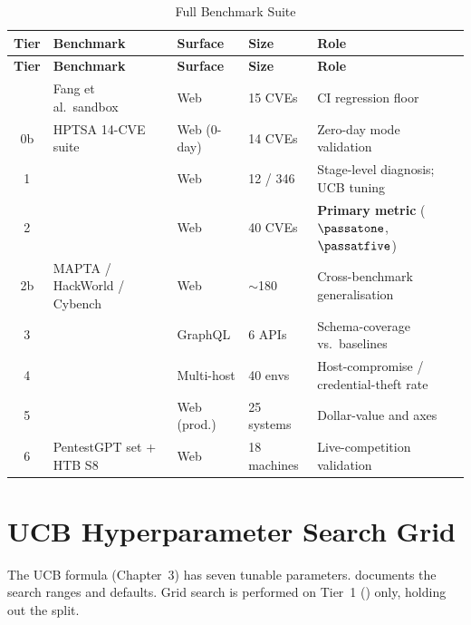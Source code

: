 \begin{longtable}{clp{3.5cm}lp{4cm}}
  \caption{Full \redgrid{} Benchmark Suite}\label{tab:benchmark-suite} \\
  \hline
  \textbf{Tier} & \textbf{Benchmark} & \textbf{Surface} & \textbf{Size} & \textbf{Role} \\
  \hline
  \endfirsthead
  \hline
  \textbf{Tier} & \textbf{Benchmark} & \textbf{Surface} & \textbf{Size} & \textbf{Role} \\
  \hline
  \endhead
  \hline
  \endfoot
  0  & Fang et al.\ sandbox    & Web           & 15 CVEs  & CI regression floor \\
  0b & HPTSA 14-CVE suite      & Web (0-day)   & 14 CVEs  & Zero-day mode validation \\
  1  & \pentesteval{}           & Web           & 12 / 346 & Stage-level diagnosis; UCB tuning \\
  2  & \cvebench{}              & Web           & 40 CVEs  & \textbf{Primary metric} ($\passatone$, $\passatfive$) \\
  2b & MAPTA / HackWorld / Cybench & Web       & $\sim$180 & Cross-benchmark generalisation \\
  3  & \prediql{}               & GraphQL       & 6 APIs   & Schema-coverage vs.\ baselines \\
  4  & \mhbench{}               & Multi-host    & 40 envs  & Host-compromise / credential-theft rate \\
  5  & \bountybench{}           & Web (prod.)   & 25 systems & Dollar-value and \cpe{} axes \\
  6  & PentestGPT set + HTB S8  & Web           & 18 machines & Live-competition validation \\
  \hline
\end{longtable}

\section{UCB Hyperparameter Search Grid}
\label{app:ucb-tuning}

The UCB formula (Chapter~3) has seven tunable parameters.  documents the search ranges and defaults. Grid search is performed on Tier~1 (\pentesteval{}) only, holding out the \cvebench{} split.

